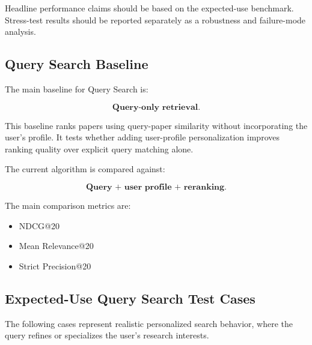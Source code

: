 \documentclass[11pt]{article}
\begin{document}
Headline performance claims should be based on the expected-use benchmark. Stress-test results should be reported separately as a robustness and failure-mode analysis.

\subsection{Query Search Baseline}

The main baseline for Query Search is:

\[
\textbf{Query-only retrieval}.
\]

This baseline ranks papers using query-paper similarity without incorporating the user's profile. It tests whether adding user-profile personalization improves ranking quality over explicit query matching alone.

The current algorithm is compared against:

\[
\textbf{Query + user profile + reranking}.
\]

The main comparison metrics are:

\begin{itemize}[leftmargin=*]
    \item NDCG@20
    \item Mean Relevance@20
    \item Strict Precision@20
\end{itemize}

\subsection{Expected-Use Query Search Test Cases}

The following cases represent realistic personalized search behavior, where the query refines or specializes the user's research interests.
\end{document}
